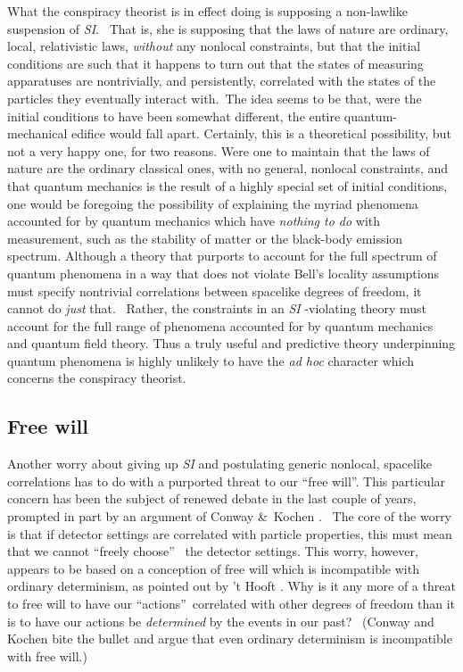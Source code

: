 \documentclass[12pt]{article}%
\begin{document}
What the conspiracy theorist is in effect doing is supposing a non-lawlike
suspension of \emph{SI}. \ That is, she is supposing that the laws of nature
are ordinary, local, relativistic laws, \emph{without} any nonlocal
constraints, but that the initial conditions are such that it happens to turn
out that the states of measuring apparatuses are nontrivially, and
persistently, correlated with the states of the particles they eventually
interact with.\ The idea seems to be that, were the initial conditions to have
been somewhat different, the entire quantum-mechanical edifice would fall
apart. Certainly, this is a theoretical possibility, but not a very happy one,
for two reasons. Were one to maintain that the laws of nature are the ordinary
classical ones, with no general, nonlocal constraints, and that quantum
mechanics is the result of a highly special set of initial conditions, one
would be foregoing the possibility of explaining the myriad phenomena
accounted for by quantum mechanics which have \emph{nothing to do }with
measurement, such as the stability of matter or the black-body emission
spectrum. Although a theory that purports to account for the full spectrum of
quantum phenomena in a way that does not violate Bell's locality assumptions
must specify nontrivial correlations between spacelike degrees of freedom, it
cannot do \emph{just} that. \ Rather, the constraints in an \emph{SI}%
-violating theory must account for the full range of phenomena accounted for
by quantum mechanics and quantum field theory. Thus a truly useful and
predictive theory underpinning quantum phenomena is highly unlikely to have
the \emph{ad hoc} character which concerns the conspiracy theorist.

\subsection{Free will}

Another worry about giving up \emph{SI} and postulating generic nonlocal,
spacelike correlations has to do with a purported threat to our
\textquotedblleft free will\textquotedblright. This particular concern has
been the subject of renewed debate in the last couple of years, prompted in
part by an argument of Conway \&\ Kochen \cite{CK06}. \ The core of the worry
is that if detector settings are correlated with particle properties, this
must mean that we cannot \textquotedblleft freely choose\textquotedblright%
\ the detector settings. This worry, however, appears to be based on a
conception of free will which is incompatible with ordinary determinism, as
pointed out by 't Hooft \cite{tHo07}. Why is it any more of a threat to free
will to have our \textquotedblleft actions\textquotedblright\ correlated with
other degrees of freedom than it is to have our actions be \emph{determined}
by the events in our past? \ (Conway and Kochen bite the bullet and argue that
even ordinary determinism is incompatible with free will.)
\end{document}
